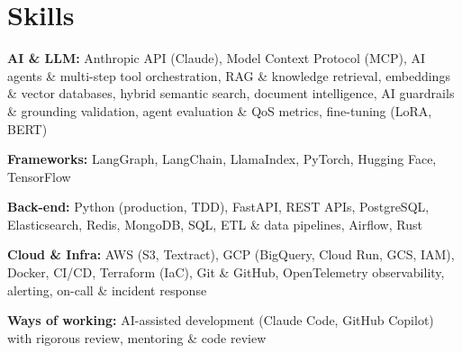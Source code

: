 \documentclass[10pt,a4paper]{article}
\begin{document}
\section{Skills}
\begin{tight}
  \item[\textcolor{accent}{\small$\bullet$}] \textbf{AI \& LLM:} Anthropic API (Claude), Model Context Protocol (MCP), AI agents \& multi-step tool orchestration, RAG \& knowledge retrieval, embeddings \& vector databases, hybrid semantic search, document intelligence, AI guardrails \& grounding validation, agent evaluation \& QoS metrics, fine-tuning (LoRA, BERT)
  \item[\textcolor{accent}{\small$\bullet$}] \textbf{Frameworks:} LangGraph, LangChain, LlamaIndex, PyTorch, Hugging Face, TensorFlow
  \item[\textcolor{accent}{\small$\bullet$}] \textbf{Back-end:} Python (production, TDD), FastAPI, REST APIs, PostgreSQL, Elasticsearch, Redis, MongoDB, SQL, ETL \& data pipelines, Airflow, Rust
  \item[\textcolor{accent}{\small$\bullet$}] \textbf{Cloud \& Infra:} AWS (S3, Textract), GCP (BigQuery, Cloud Run, GCS, IAM), Docker, CI/CD, Terraform (IaC), Git \& GitHub, OpenTelemetry observability, alerting, on-call \& incident response
  \item[\textcolor{accent}{\small$\bullet$}] \textbf{Ways of working:} AI-assisted development (Claude Code, GitHub Copilot) with rigorous review, mentoring \& code review
\end{tight}

\end{document}
